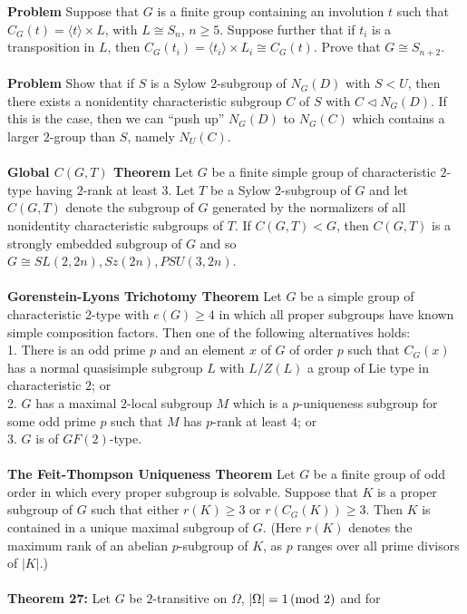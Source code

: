 {\bf Problem} Suppose that $G$ is a finite group containing an involution $t$ such that
$C_G(t) = \langle t \rangle \times L$, with $L \cong  S_n$, $n \ge  5$. Suppose
further that if $t_i$ is a transposition in $L$, then $C_G(t_i) = \langle t_i \rangle \times L_i \cong  C_G(t)$. Prove
that $G \cong  S_{n+2}$.
\\
\\
{\bf Problem} Show that if $S$ is a Sylow $2$-subgroup of $N_G(D)$ with $S<U$, then
there exists a nonidentity characteristic subgroup $C$ of $S$ with $C \lhd N_G(D)$.
If this is the case, then we can “push up” $N_G(D)$ to $N_G(C)$ which contains a
larger $2$-group than $S$, namely $N_U(C)$.
\\
\\
{\bf Global $C(G, T)$ Theorem} Let $G$ be a finite simple group of characteristic $2$-type
having $2$-rank at least $3$. Let $T$ be a Sylow $2$-subgroup of $G$ and let $C(G, T)$ denote
the subgroup of $G$ generated by the normalizers of all nonidentity characteristic
subgroups of $T$. If $C(G, T) < G$, then $C(G, T)$ is a strongly embedded subgroup of
$G$ and so $G \cong  SL(2, 2n), Sz(2n), PSU(3, 2n)$.
\\
\\
{\bf Gorenstein-Lyons Trichotomy Theorem} Let $G$ be a simple group of characteristic $2$-type with $e(G) \ge  4$ in which all proper subgroups have known simple
composition factors. Then one of the following alternatives holds:
\\
1. There is an odd prime $p$ and an element $x$ of $G$ of order $p$ such that $C_G(x)$
has a normal quasisimple subgroup $L$ with $L/Z(L)$ a group of Lie type in
characteristic $2$; or
\\
2. $G$ has a maximal $2$-local subgroup $M$ which is a $p$-uniqueness subgroup for
some odd prime $p$ such that $M$ has $p$-rank at least $4$; or
\\
3. $G$ is of $GF(2)$-type.
\\
\\
{\bf The Feit-Thompson Uniqueness Theorem} Let $G$ be a finite group of odd order in which every proper subgroup is solvable. Suppose that $K$ is a proper subgroup
of $G$ such that either $r(K) \geq 3$ or $r(C_G(K)) \ge 3$. Then $K$ is contained in a unique
maximal subgroup of $G$. (Here $r(K)$ denotes the maximum rank of an abelian $p$-subgroup of $K$, as $p$ ranges over all prime divisors of $|K|$.)
\\
\\
{\bf Theorem 27:} Let $G$ be $2$-transitive on $\Omega$, $|\Omega| = 1 \thinspace \textnormal{(mod } 2 \textnormal{)}$ and for
